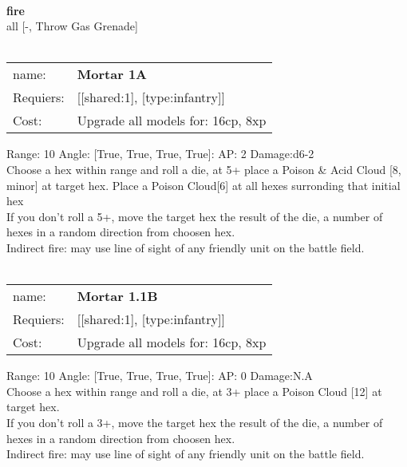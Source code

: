 \ \\ {\bf fire } \\
all [-, Throw Gas Grenade] \\

\ \\
\begin{tabular}{ll}
name: & {\bf Mortar 1A } \\
Requiers: & [[shared:1], [type:infantry]] \\
Cost: & Upgrade all models for: 16cp, 8xp \\
\end{tabular}



Range: 10  Angle: [True, True, True, True]: AP: 2 Damage:d6-2 \\
Choose a hex within range and roll a die, at 5+ place a Poison \& Acid Cloud [8, minor] at target hex. Place a Poison Cloud[6]  at all hexes surronding that initial hex\\ 
If you don't roll a 5+, move the target hex the result of the die, a number of hexes in a random direction from choosen hex.\\ 
Indirect fire: may use line of sight of any friendly unit on the battle field.\\ 








\ \\
\begin{tabular}{ll}
name: & {\bf Mortar 1.1B } \\
Requiers: & [[shared:1], [type:infantry]] \\
Cost: & Upgrade all models for: 16cp, 8xp \\
\end{tabular}



Range: 10  Angle: [True, True, True, True]: AP: 0 Damage:N.A \\
Choose a hex within range and roll a die, at 3+ place a Poison Cloud [12] at target hex.\\ 
If you don't roll a 3+, move the target hex the result of the die, a number of hexes in a random direction from choosen hex.\\ 
Indirect fire: may use line of sight of any friendly unit on the battle field.\\ 








